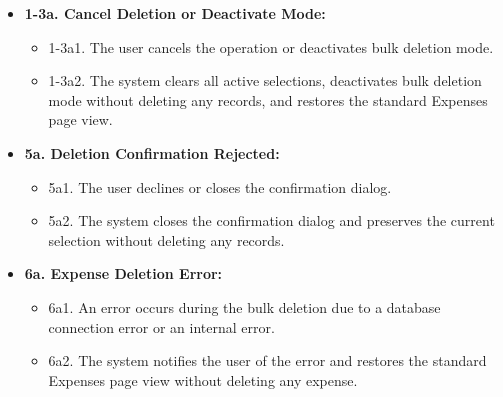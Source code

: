 \begin{itemize} [label={}, leftmargin=0.75cm, noitemsep]
    \item \textbf{1-3a. Cancel Deletion or Deactivate Mode:}
    \begin{itemize} [label={}, leftmargin=0.75cm, noitemsep]
        \item 1-3a1. The user cancels the operation or deactivates bulk deletion mode.
        \item 1-3a2. The system clears all active selections, deactivates bulk deletion mode without deleting any records, and restores the standard Expenses page view.
    \end{itemize}

    \item \textbf{5a. Deletion Confirmation Rejected:}
    \begin{itemize} [label={}, leftmargin=0.75cm, noitemsep]
        \item 5a1. The user declines or closes the confirmation dialog.
        \item 5a2. The system closes the confirmation dialog and preserves the current selection without deleting any records.
    \end{itemize}

    \item \textbf{6a. Expense Deletion Error:}
    \begin{itemize} [label={}, leftmargin=0.75cm, noitemsep]
        \item 6a1. An error occurs during the bulk deletion due to a database connection error or an internal error.
        \item 6a2. The system notifies the user of the error and restores the standard Expenses page view without deleting any expense.
    \end{itemize}
\end{itemize}